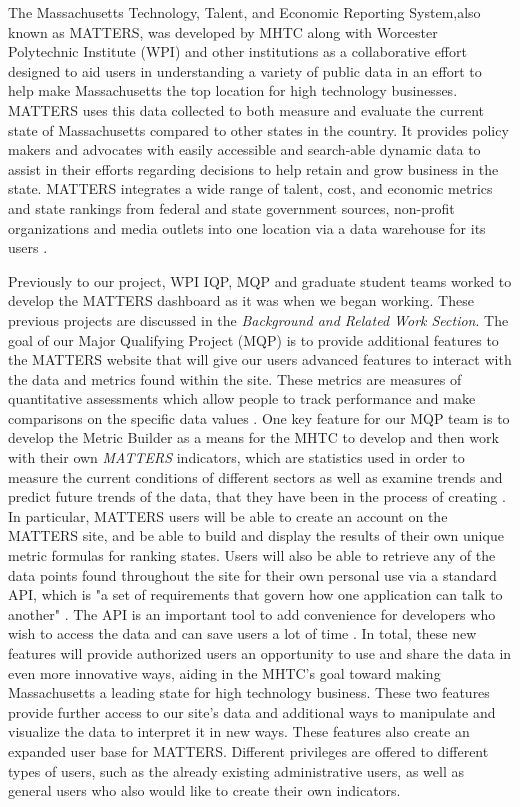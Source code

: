 	The Massachusetts Technology, Talent, and Economic Reporting System,also known as MATTERS, 
	was developed by MHTC along with Worcester Polytechnic Institute (WPI) and other 
	institutions as a collaborative effort designed to aid users in understanding a 
	variety of public data in an effort to help make Massachusetts the top location 
	for high technology businesses. MATTERS uses this data collected to both measure 
	and evaluate the current state of Massachusetts compared to other states in the 
	country. It provides policy makers and advocates with easily accessible and search-able 
	dynamic data to assist in their efforts regarding decisions to help  retain and 
	grow business in the state. MATTERS integrates a wide 
	range of talent, cost, and economic metrics and state rankings from federal and 
	state government sources, non-profit organizations and media outlets into one 
	location via a data warehouse for its users \cite{about}. 

	Previously to our project, WPI IQP, MQP and graduate student teams worked to 
	develop the MATTERS dashboard as it was when we began working. These previous projects are discussed 
	in the \textit{Background and Related Work Section}. The goal of our 
	Major Qualifying Project (MQP) is to provide additional features to the MATTERS 
	website that will give our users advanced features to interact with the data and 
	metrics found within the site. These metrics are measures of quantitative assessments which allow people to track performance and make comparisons on the specific data values \cite{metrics}. One key feature for our MQP team is to develop the Metric Builder 
	as a means for the MHTC to develop and then work with their own 
	\textit{MATTERS} indicators, which are statistics used in order to measure the current conditions of different sectors as well as examine trends and predict future trends of the data, that they have been in the process of creating \cite{indicator}. In particular, MATTERS users will be able to 
	create an account on the MATTERS site, and be able to build and display the 
	results of their own unique metric formulas for ranking states. Users will 
	also be able to retrieve any of the data points found throughout the site 
	for their own personal use via a standard API, which is "a set of requirements that govern how one application can talk to another" \cite{apidef}. The API is an important tool to add convenience for developers who wish to access the data and can save users a lot of time \cite{apidef}. In total, these new 
	features will provide authorized users an opportunity to use and share the 
	data in even more innovative ways, aiding in the MHTC's goal toward making 
	Massachusetts a leading state for high technology business. These two features 
	provide further access to our site's data and additional ways to manipulate and 
	visualize the data to interpret it in new ways. These features also create an 
	expanded user base for MATTERS. Different privileges are offered to different types of 
	users, such as the already existing administrative users, as well as general users who 
	also would like to create their own indicators.